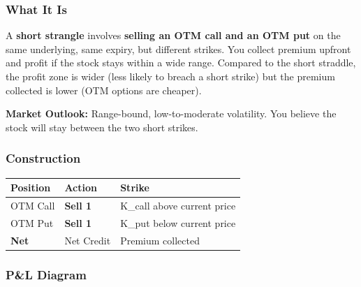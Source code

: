 \documentclass[12pt,openany]{book}
\begin{document}
\subsubsection{What It Is}

A \textbf{short strangle} involves \textbf{selling an OTM call and an OTM put} on the same underlying, same expiry, but different strikes. You collect premium upfront and profit if the stock stays within a wide range. Compared to the short straddle, the profit zone is wider (less likely to breach a short strike) but the premium collected is lower (OTM options are cheaper).

\textbf{Market Outlook:} Range-bound, low-to-moderate volatility. You believe the stock will stay between the two short strikes.



\subsubsection{Construction}

\begin{center}
\scriptsize
\setlength{\tabcolsep}{3pt}
\begin{tabular}{|L{4.42cm}|L{4.42cm}|L{4.42cm}|}
\hline
Position & Action & Strike \\
\hline
OTM Call & \textbf{Sell 1} & K\_call above current price \\
\hline
OTM Put & \textbf{Sell 1} & K\_put below current price \\
\hline
\textbf{Net} & Net Credit & Premium collected \\
\hline
\end{tabular}
\end{center}



\subsubsection{P\&L Diagram}
\end{document}

